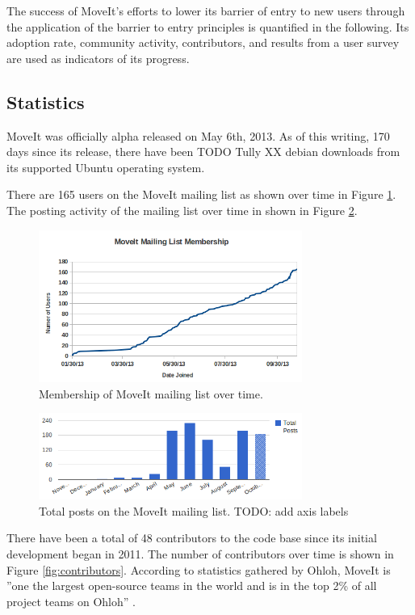 \documentclass[10pt,journal,compsoc]{joser1}
\begin{document}
{The success of MoveIt's efforts to lower its barrier of entry to new users through the application of the barrier to entry principles is quantified in the following. Its adoption rate, community activity, contributors, and results from a user survey are used as indicators of its progress.

\subsection{Statistics}
\label{sec::statistics}

MoveIt was officially alpha released on May 6th, 2013. As of this writing, 170 days since its release, there have been TODO Tully XX debian downloads from its supported Ubuntu operating system.

There are 165 users on the MoveIt mailing list as shown over time in Figure \ref{fig:membership_plot}. The posting activity of the mailing list over time in shown in Figure \ref{fig:mailing_list}.

\begin{figure}[!t]
\centering
\includegraphics[width=3.4in]{images/membership_plot}
\caption{Membership of MoveIt mailing list over time.}
\label{fig:membership_plot}
\end{figure}

\begin{figure}[!t]
\centering
\includegraphics[width=3.4in]{images/mailing_list}
\caption{Total posts on the MoveIt mailing list. TODO: add axis labels}
\label{fig:mailing_list}
\end{figure}

There have been a total of 48 contributors to the code base since its initial development began in 2011. The number of contributors over time is shown in Figure \ref{fig:contributors}. According to statistics gathered by Ohloh, MoveIt is ''one the largest open-source teams in the world and is in the top 2\% of all project teams on Ohloh'' \cite{ohloh}.

}
\end{document}
